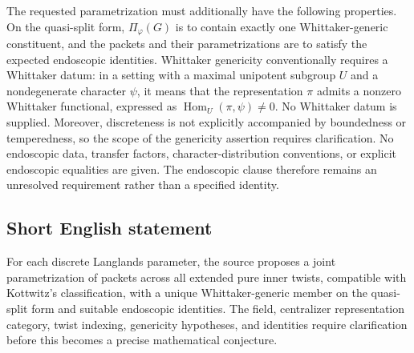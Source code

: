 \documentclass[11pt]{article}
\begin{document}
The requested parametrization must additionally have the following properties. On the quasi-split form, \(\Pi_{\varphi}(G)\) is to contain exactly one Whittaker-generic constituent, and the packets and their parametrizations are to satisfy the expected endoscopic identities. Whittaker genericity conventionally requires a Whittaker datum: in a setting with a maximal unipotent subgroup \(U\) and a nondegenerate character \(\psi\), it means that the representation \(\pi\) admits a nonzero Whittaker functional, expressed as \(\operatorname{Hom}_{U}(\pi,\psi)\ne0\). No Whittaker datum is supplied. Moreover, discreteness is not explicitly accompanied by boundedness or temperedness, so the scope of the genericity assertion requires clarification. No endoscopic data, transfer factors, character-distribution conventions, or explicit endoscopic equalities are given. The endoscopic clause therefore remains an unresolved requirement rather than a specified identity.
\subsection{Short English statement}
For each discrete Langlands parameter, the source proposes a joint parametrization of packets across all extended pure inner twists, compatible with Kottwitz's classification, with a unique Whittaker-generic member on the quasi-split form and suitable endoscopic identities. The field, centralizer representation category, twist indexing, genericity hypotheses, and identities require clarification before this becomes a precise mathematical conjecture.
\end{document}
